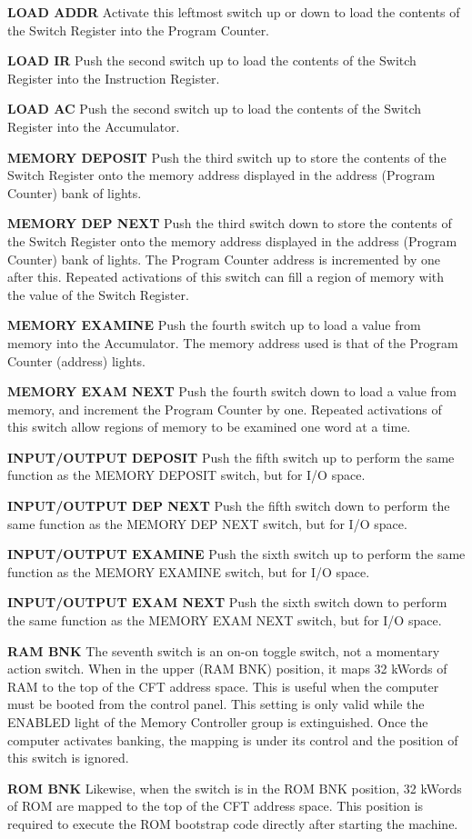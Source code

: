 \documentclass[11pt,a4paper,twocolumns]{article}
\newcommand{\lt}[1]{\textsf{#1}}
\newcommand{\sw}[1]{\textsf{#1}}
\begin{document}
\begin{description}
\item{\bf\sw{LOAD ADDR}} Activate this leftmost switch up or down to load the
  contents of the Switch Register into the Program Counter.
\item{\bf\sw{LOAD IR}} Push the second switch up to load the contents
  of the Switch Register into the Instruction Register.
\item{\bf\sw{LOAD AC}} Push the second switch up to load the contents
  of the Switch Register into the Accumulator.
\item{\bf\sw{MEMORY DEPOSIT}} Push the third switch up to store the
  contents of the Switch Register onto the memory address displayed in
  the address (Program Counter) bank of lights.
\item{\bf\sw{MEMORY DEP NEXT}} Push the third switch down to store the
  contents of the Switch Register onto the memory address displayed in
  the address (Program Counter) bank of lights. The Program Counter
  address is incremented by one after this. Repeated activations of
  this switch can fill a region of memory with the value of the Switch
  Register.
\item{\bf\sw{MEMORY EXAMINE}} Push the fourth switch up to load a
  value from memory into the Accumulator. The memory address used is
  that of the Program Counter (address) lights.
\item{\bf\sw{MEMORY EXAM NEXT}} Push the fourth switch down to load a
  value from memory, and increment the Program Counter by
  one. Repeated activations of this switch allow regions of memory to
  be examined one word at a time.
\item{\bf\sw{INPUT/OUTPUT DEPOSIT}} Push the fifth switch up to
  perform the same function as the \sw{MEMORY DEPOSIT} switch, but for
  I/O space.
\item{\bf\sw{INPUT/OUTPUT DEP NEXT}} Push the fifth switch down to
  perform the same function as the \sw{MEMORY DEP NEXT} switch, but
  for I/O space.
\item{\bf\sw{INPUT/OUTPUT EXAMINE}} Push the sixth switch up to
  perform the same function as the \sw{MEMORY EXAMINE} switch, but for
  I/O space.
\item{\bf\sw{INPUT/OUTPUT EXAM NEXT}} Push the sixth switch down to
  perform the same function as the \sw{MEMORY EXAM NEXT} switch, but
  for I/O space.

\item{\bf\sw{RAM BNK}} The seventh switch is an on-on toggle switch,
  not a momentary action switch. When in the upper (\sw {RAM BNK})
  position, it maps 32 kWords of RAM to the top of the CFT address
  space. This is useful when the computer must be booted from the
  control panel. This setting is only valid while the \lt{ENABLED}
  light of the Memory Controller group is extinguished. Once the
  computer activates banking, the mapping is under its control and the
  position of this switch is ignored.
\item{\bf\sw{ROM BNK}} Likewise, when the switch is in the \sw{ROM
  BNK} position, 32 kWords of ROM are mapped to the top of the CFT
  address space. This position is required to execute the ROM
  bootstrap code directly after starting the machine.


\end{description}
\end{document}
